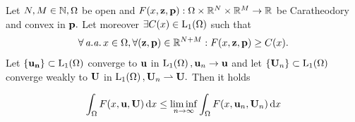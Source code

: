 \documentclass{article}
\begin{document}
\begin{theorem}
	Let $N, M \in {\mathbb N}, \Omega$ be open and $F\qty(x, \vb{z}, \vb{p}): \Omega \times {\mathbb R}^{N} \times {\mathbb R}^{M} \to {\mathbb R}$ be Caratheodory and convex in $\vb{p}.$ Let moreover $\exists C(x) \in \LpSet[1]{\Omega}$ such that
	\[
		\forall \, \text{\textit{a.a.}} \, x \in \Omega, \forall \qty(\vb{z}, \vb{p}) \in {\mathbb R}^{N+M}: F\qty(x, \vb{z}, \vb{p}) \geq C(x).
	\]
	Let $\qty{\vb{u_n}} \subset \LpSet[1]{\Omega}$ converge to $\vb{u}$ in $\LpSet[1]{\Omega}, \vb{u}_n \to \vb{u}$ and let $\qty{\vb{U}_n} \subset \LpSet[1]{\Omega}$ converge weakly to $\vb{U}$ in $\LpSet[1]{\Omega}, \vb{U}_n \rightharpoonup \vb{U}.$ Then it holds

	\[
		\int_{\Omega}F\qty(x, \vb{u}, \vb{U})\dd{x} \leq \liminf_{n\to \infty} \int_{\Omega}F\qty(x, \vb{u}_n, \vb{U}_n)\dd{x}
	\]
\end{theorem}
\end{document}
